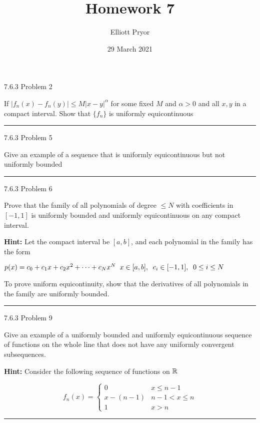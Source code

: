 \documentclass[11pt]{article}
\title{Homework 7}
\author{Elliott Pryor}
\date{29 March 2021}
\begin{document}
\maketitle

 7.6.3 Problem 2

If $|f_n(x) - f_n(y)| \leq M |x - y|^\alpha$ for some fixed $M$ and $\alpha > 0$
and all $x,y$ in a compact interval. Show that $\{f_n\}$ is uniformly
equicontinuous

\hrule



 7.6.3 Problem 5

Give an example of a sequence that is uniformly equicontinuous 
but not uniformly bounded

\hrule



 7.6.3 Problem 6

Prove that the family of all polynomials of degree $\leq N$ with
coefficients in $[-1,1]$ is uniformly bounded and uniformly
equicontinuous on any compact interval. 

\textbf{Hint: }
Let the compact interval be $[a, b]$, and each polynomial in the family has the form

$p(x) = c_0 + c_1 x + c_2 x^2 + \dots + c_N x^N \sp x \in [a,b], \sp c_i \in [-1, 1], \sp 0 \leq i \leq N$

To prove uniform equicontinuity, show that the derivatives of all polynomials in the 
family are uniformly bounded.

\hrule




 7.6.3 Problem 9

Give an example of a uniformly bounded and uniformly equicontinuous
sequence of functions on the whole line that does not have any uniformly
convergent subsequences.

\textbf{Hint: } Consider the following sequence of functions on $\reals$

$$f_n(x) = \begin{cases}
    0 & x \leq n-1\\
    x - (n-1) & n-1 < x \leq n\\
    1 & x > n
\end{cases}$$

\hrule
\end{document}
